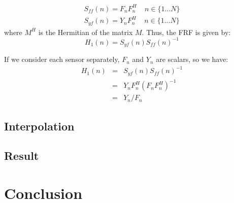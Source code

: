 \documentclass[journal]{IEEEtran}
\begin{document}
\begin{equation}
\begin{array}{ll}
S_{ff}(n) = F_n F_n^H \ \ \ \ \ n \in \{1 ... N\} \\
S_{yf}(n) = Y_n F_n^H \ \ \ \ \ n \in \{1 ... N\}
\end{array}
\end{equation}
where $M^H$ is the Hermitian of the matrix $M$. Thus, the FRF is given by:
\begin{equation}
H_1(n) = S_{yf}(n) S_{ff}(n)^{-1}
\end{equation}

\begin{remark}
If we consider each sensor separately, $F_n$ and $Y_n$ are scalars, so we have:
\begin{equation}
\begin{array}{lll}
H_1(n) & = & S_{yf}(n) S_{ff}(n)^{-1} \\
& = & Y_n F_n^H (F_n F_n^H)^{-1} \\
& = & Y_n / F_n
\end{array}
\end{equation}
\end{remark}

\subsection{Interpolation}

\subsection{Result}

\section{Conclusion}







%
%

\nocite{*}
\printbibliography
\end{document}
